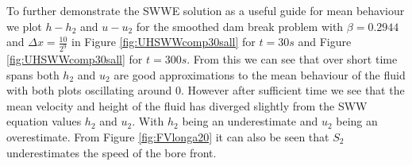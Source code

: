 \documentclass[SingleSpace,12pt,Proceedings]{Serre_ASCE}
\begin{document}
To further demonstrate the SWWE solution as a useful guide for mean behaviour we plot $h - h_2$ and $u - u_2$ for the smoothed dam break problem with $\beta = 0.2944$ and $\Delta x = \frac{10}{2^9}$ in Figure \ref{fig:UHSWWcomp30sall} for $t= 30s$ and Figure \ref{fig:UHSWWcomp30sall} for $t= 300s$. From this we can see that over short time spans both $h_2$ and $u_2$ are good approximations to the mean behaviour of the fluid with both plots oscillating around $0$. However after sufficient time we see that the mean velocity and height of the fluid has diverged slightly from the SWW equation values $h_2$ and $u_2$. With $h_2$ being an underestimate and $u_2$ being an overestimate. From Figure \ref{fig:FVlonga20} it can also be seen that $S_2$ underestimates the speed of the bore front.

\begin{figure}
	\centering

\end{figure}
\end{document}

